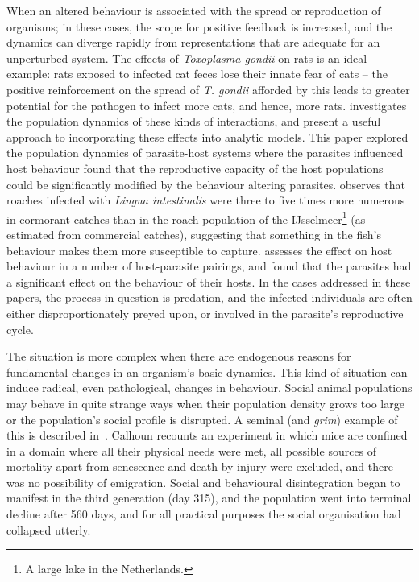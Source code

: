 When an altered behaviour is associated with the spread or
reproduction of organisms; in these cases, the scope for positive
feedback is increased, and the dynamics can diverge rapidly from
representations that are adequate for an unperturbed system.  The
effects of \textit{Toxoplasma gondii} on rats
\cite{berdoy2000fatal} is an ideal example: rats exposed to
infected cat feces lose their innate fear of cats -- the positive
reinforcement on the spread of \textit{T. gondii} afforded by this
leads to greater potential for the pathogen to infect more cats, and
hence, more rats.  investigates the
population dynamics of these kinds of interactions, and present a
useful approach to incorporating these effects into analytic
models. This paper explored the population dynamics of parasite-host
systems where the parasites influenced host behaviour found that the
reproductive capacity of the host populations could be significantly
modified by the behaviour altering parasites. 
observes that roaches infected with \textit{Lingua intestinalis} were
three to five times more numerous in cormorant catches than in the
roach population of the IJsselmeer\footnote{A large lake in the
Netherlands.} (as estimated from commercial catches), suggesting that
something in the fish's behaviour makes them more susceptible to
capture. \Cite{poulin1994meta} assesses the effect on host behaviour
in a number of host-parasite pairings, and found that the parasites
had a significant effect on the behaviour of their hosts.  In the
cases addressed in these papers, the process in question is predation,
and the infected individuals are often either disproportionately
preyed upon, or involved in the parasite's reproductive cycle.

The situation is more complex when there are endogenous reasons for
fundamental changes in an organism's basic dynamics. This kind of situation
can induce radical, even pathological, changes in behaviour.  Social
animal populations may behave in quite strange ways when their
population density grows too large or the population's social profile
is disrupted.  A seminal (and \emph{grim}) example of this is described
in~\cite{calhoun1973death}. Calhoun recounts an experiment in which
mice are confined in a domain where all their physical needs were met,
all possible sources of mortality apart from senescence and death by
injury were excluded, and there was no possibility of emigration.
Social and behavioural disintegration began to manifest in the third
generation (day 315), and the population went into terminal decline
after 560 days, and for all practical purposes the social organisation
had collapsed utterly.

